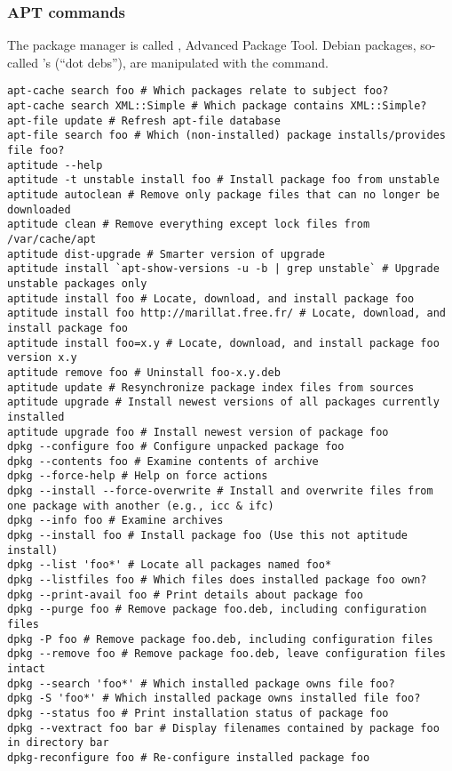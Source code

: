 \documentclass[12pt,twoside]{article}
\begin{document}
\subsubsection{APT commands}\label{sxn:apt}
The  package manager is called , Advanced
Package Tool.
Debian packages, so-called 's (``dot debs''), are
manipulated with the  command. 
\begin{verbatim}
apt-cache search foo # Which packages relate to subject foo?
apt-cache search XML::Simple # Which package contains XML::Simple?
apt-file update # Refresh apt-file database
apt-file search foo # Which (non-installed) package installs/provides file foo?
aptitude --help
aptitude -t unstable install foo # Install package foo from unstable
aptitude autoclean # Remove only package files that can no longer be downloaded
aptitude clean # Remove everything except lock files from /var/cache/apt
aptitude dist-upgrade # Smarter version of upgrade
aptitude install `apt-show-versions -u -b | grep unstable` # Upgrade unstable packages only
aptitude install foo # Locate, download, and install package foo
aptitude install foo http://marillat.free.fr/ # Locate, download, and install package foo
aptitude install foo=x.y # Locate, download, and install package foo version x.y
aptitude remove foo # Uninstall foo-x.y.deb
aptitude update # Resynchronize package index files from sources
aptitude upgrade # Install newest versions of all packages currently installed
aptitude upgrade foo # Install newest version of package foo
dpkg --configure foo # Configure unpacked package foo
dpkg --contents foo # Examine contents of archive
dpkg --force-help # Help on force actions
dpkg --install --force-overwrite # Install and overwrite files from one package with another (e.g., icc & ifc)
dpkg --info foo # Examine archives
dpkg --install foo # Install package foo (Use this not aptitude install)
dpkg --list 'foo*' # Locate all packages named foo*
dpkg --listfiles foo # Which files does installed package foo own?
dpkg --print-avail foo # Print details about package foo
dpkg --purge foo # Remove package foo.deb, including configuration files
dpkg -P foo # Remove package foo.deb, including configuration files
dpkg --remove foo # Remove package foo.deb, leave configuration files intact
dpkg --search 'foo*' # Which installed package owns file foo?
dpkg -S 'foo*' # Which installed package owns installed file foo?
dpkg --status foo # Print installation status of package foo
dpkg --vextract foo bar # Display filenames contained by package foo in directory bar
dpkg-reconfigure foo # Re-configure installed package foo
\end{verbatim}
\end{document}
